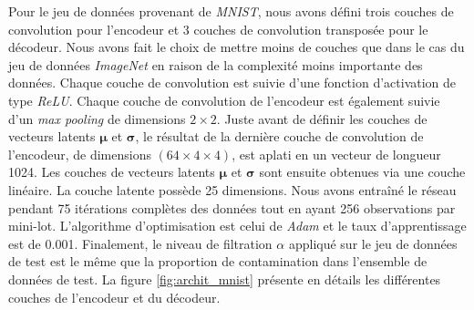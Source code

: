 Pour le jeu de données provenant de \textit{MNIST}, nous avons défini trois couches de convolution pour l'encodeur et 3 couches de convolution transposée pour le décodeur. Nous avons fait le choix de mettre moins de couches que dans le cas du jeu de données \textit{ImageNet} en raison de la complexité moins importante des données.  Chaque couche de convolution est suivie d'une fonction d'activation de type \textit{ReLU}. Chaque couche de convolution de l'encodeur est également suivie d'un \textit{max pooling} de dimensions $2 \times 2$. Juste avant de définir les couches de vecteurs latents $\boldsymbol{\mu}$ et $\boldsymbol{\sigma}$, le résultat de la dernière couche de convolution de l'encodeur, de dimensions $(64 \times 4 \times 4)$, est aplati en un vecteur  de longueur 1024. Les couches de vecteurs latents $\boldsymbol{\mu}$ et $\boldsymbol{\sigma}$ sont ensuite obtenues via une couche linéaire. La couche latente possède 25 dimensions. Nous avons entraîné le réseau pendant 75 itérations complètes des données tout en ayant 256 observations par mini-lot. L'algorithme d'optimisation est celui de \textit{Adam} et le taux d'apprentissage est de 0.001. Finalement, le niveau de filtration $\alpha$ appliqué sur le jeu de données de test est le même que la proportion de contamination dans l'ensemble de données de test. La figure \ref{fig:archit_mnist} présente en détails les différentes couches de l'encodeur et du décodeur.

